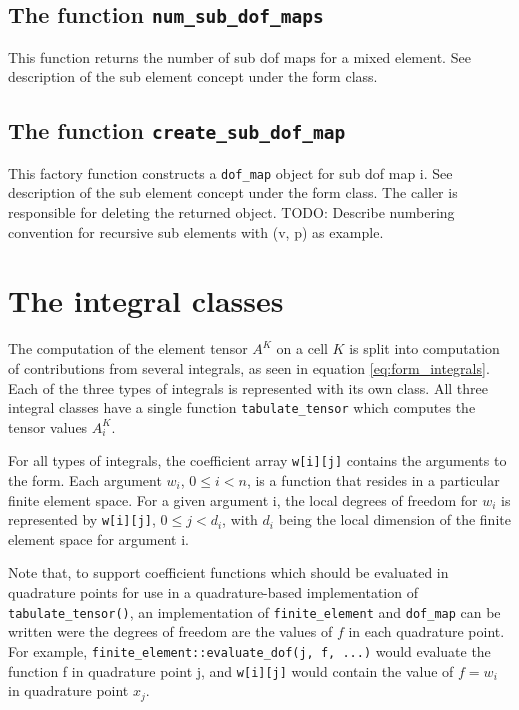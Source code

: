 \subsection{The function \texttt{num\_sub\_dof\_maps}}
This function returns the number of sub dof maps for a mixed element.
See description of the sub element concept under the form class.


\subsection{The function \texttt{create\_sub\_dof\_map}}
This factory function constructs a \texttt{dof\_map} object for sub dof map i.
See description of the sub element concept under the form class.
The caller is responsible for deleting the returned object.
TODO: Describe numbering convention for recursive sub elements with (v, p) as example.




\section{The integral classes}

The computation of the element tensor $A^K$ on a cell $K$ is split into computation of
contributions from several integrals, as seen in equation \eqref{eq:form_integrals}.
Each of the three types of integrals is represented with its own class.
All three integral classes have a single function \texttt{tabulate\_tensor} which
computes the tensor values $A_i^K$.

For all types of integrals, the coefficient array \texttt{w[i][j]} contains the
arguments to the form. Each argument $w_i$, $0\le i<n$, is a function that resides in a 
particular finite element space. For a given argument i, the local degrees of freedom for $w_i$
is represented by \texttt{w[i][j]}, $0 \le j < d_i$, with $d_i$ being the local dimension of
the finite element space for argument i.

Note that, to support coefficient functions which should be evaluated in quadrature points
for use in a quadrature-based implementation of \texttt{tabulate\_tensor()},
an implementation of \texttt{finite\_element} and \texttt{dof\_map}
can be written were the degrees of freedom are the values of $f$ in each
quadrature point. For example, \texttt{finite\_element::evaluate\_dof(j, f, ...)}
would evaluate the function f in quadrature point j, and \texttt{w[i][j]} would contain
the value of $f=w_i$ in quadrature point $x_j$.

